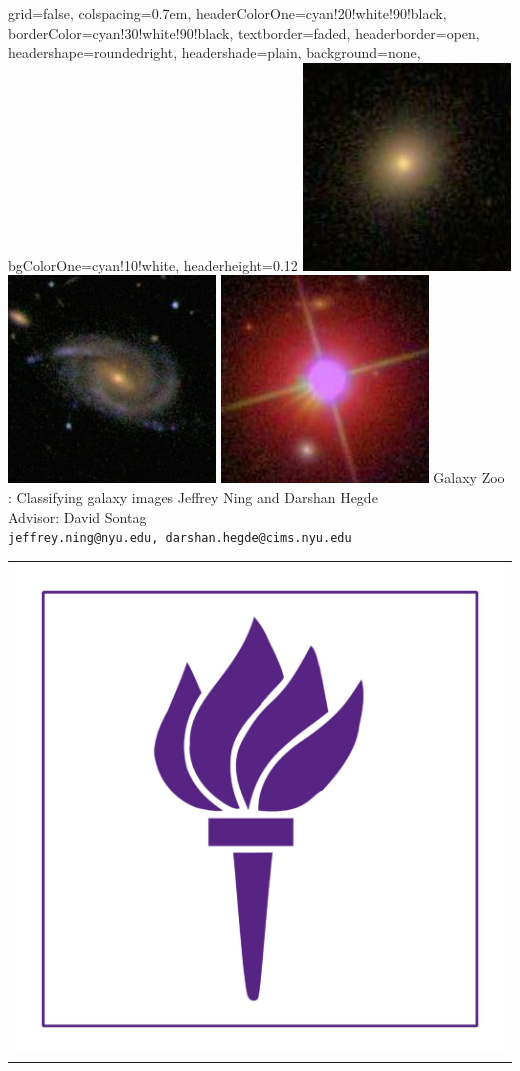 \documentclass[landscape,a0paper,fontscale=0.292]{baposter}
\begin{document}
\begin{poster}{
 grid=false,
 colspacing=0.7em,
 headerColorOne=cyan!20!white!90!black,
 borderColor=cyan!30!white!90!black,
 textborder=faded,
 headerborder=open,
 headershape=roundedright,
 headershade=plain,
 background=none,
 bgColorOne=cyan!10!white,
 headerheight=0.12\textheight}
 {
      \includegraphics[width=0.08\linewidth]{Class1_1.jpg}
      \includegraphics[width=0.08\linewidth]{Class1_2.jpg}
      \includegraphics[width=0.08\linewidth]{Class1_3.jpg}
 }
 {\sc\Huge Galaxy Zoo : Classifying galaxy images}
 {Jeffrey Ning and Darshan Hegde\\Advisor: David Sontag\\[1em]
 {\texttt{jeffrey.ning@nyu.edu, darshan.hegde@cims.nyu.edu}}}
 {
  \begin{tabular}{r}
    \includegraphics[height=0.12\textheight]{NYUTorch.jpg}\\
  \end{tabular}
 }


\end{poster}
\end{document}
